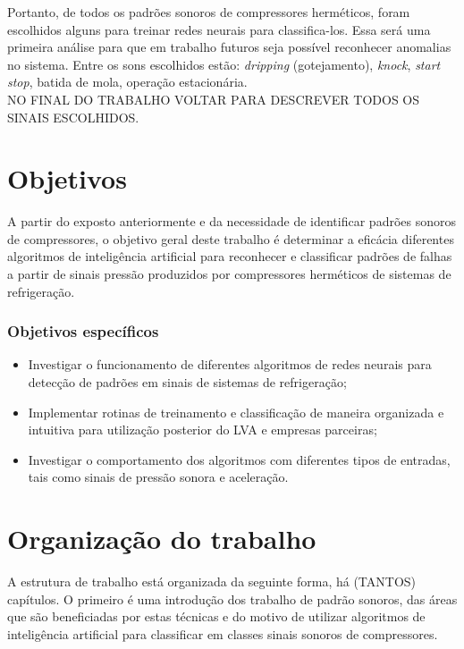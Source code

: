     Portanto, de todos os padrões sonoros de compressores herméticos, foram escolhidos alguns para treinar redes neurais para classifica-los. Essa será uma primeira análise para que em trabalho futuros seja possível reconhecer anomalias no sistema. Entre os sons escolhidos estão: \textit{dripping} (gotejamento), \textit{knock}, \textit{start stop}, batida de mola, operação estacionária.\\
    
    NO FINAL DO TRABALHO VOLTAR PARA DESCREVER TODOS OS SINAIS ESCOLHIDOS.
    
    \section{Objetivos}    
    
        A partir do exposto anteriormente e da necessidade de identificar padrões sonoros de compressores,  o objetivo geral deste trabalho é determinar a eficácia diferentes algoritmos de inteligência artificial para reconhecer e classificar padrões de falhas a partir de sinais pressão produzidos por compressores herméticos de sistemas de refrigeração.
    
    \subsubsection*{Objetivos específicos}
    
        \begin{itemize}
            \item Investigar o funcionamento de diferentes algoritmos de redes neurais para detecção de padrões em sinais de sistemas de refrigeração;
            \item Implementar rotinas de treinamento e classificação de maneira organizada e intuitiva para utilização posterior do \gls{LVA} e empresas parceiras;
            \item Investigar o comportamento dos algoritmos com diferentes tipos de entradas, tais como sinais de pressão sonora e aceleração.
        \end{itemize}
        
    \section{Organização do trabalho}
        
        A estrutura de trabalho está organizada da seguinte forma, há (TANTOS) capítulos. O primeiro é uma introdução dos trabalho de padrão sonoros, das áreas que são beneficiadas por estas técnicas e do motivo de utilizar algoritmos de inteligência artificial para classificar em classes sinais sonoros de compressores.
    

